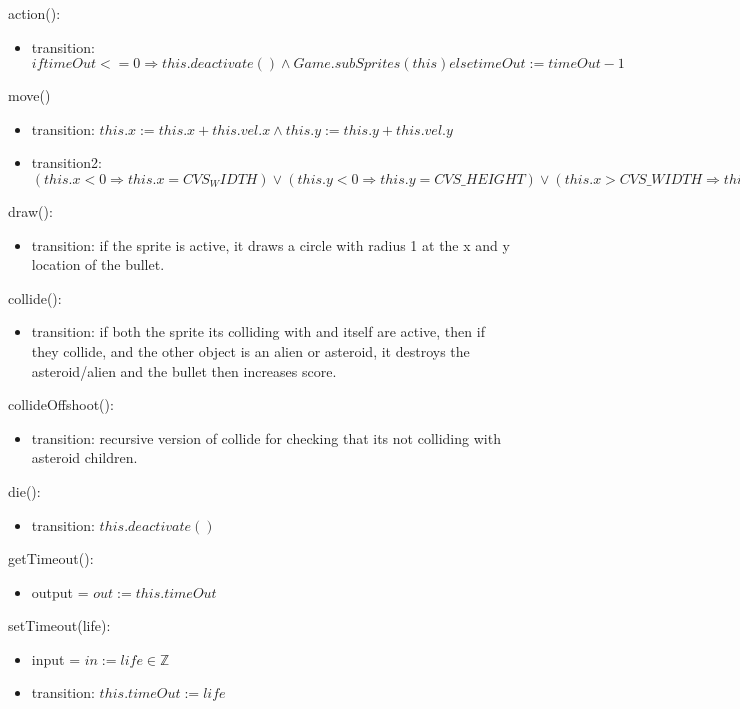 \documentclass[12pt]{article}
\begin{document}
action():
\begin{itemize}
    \item transition: $if timeOut <=0 \Rightarrow this.deactivate() \land Game.subSprites(this) else timeOut := timeOut - 1$
\end{itemize}

move()
\begin{itemize}
    \item transition: $this.x := this.x + this.vel.x \land this.y := this.y + this.vel.y$
    \item transition2: $(this.x < 0 \Rightarrow this.x = CVS_WIDTH) \lor (this.y < 0 \Rightarrow this.y = CVS\_HEIGHT) \lor (this.x > CVS\_WIDTH \Rightarrow this.x = 0) \lor (this.y > CVS\_HEIGHT \Rightarrow this.y = 0)$
\end{itemize}

draw():
\begin{itemize}
    \item transition: if the sprite is active, it draws a circle with radius 1 at the x and y location of the bullet.
\end{itemize}

collide():
\begin{itemize}
    \item transition: if both the sprite its colliding with and itself are active, then if they collide, and the other object is an alien or asteroid, it destroys the asteroid/alien and the bullet then increases score.
\end{itemize}

collideOffshoot():
\begin{itemize}
    \item transition: recursive version of collide for checking that its not colliding with asteroid children.
\end{itemize}
\newpage

die():
\begin{itemize}
    \item transition: $this.deactivate()$
\end{itemize}
getTimeout():
\begin{itemize}
    \item output = $out := this.timeOut$
\end{itemize}

setTimeout(life):
\begin{itemize}
    \item input = $in := life \in \mathbb{Z}$
    \item transition: $this.timeOut := life$
\end{itemize}
\end{document}
